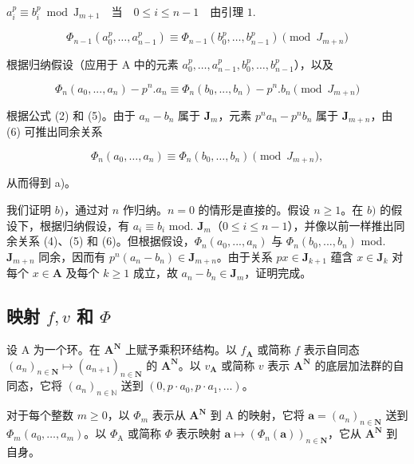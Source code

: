 \(a_{i}^{p}\equiv b_{i}^{p}\bmod \mathrm{J}_{m + 1}\quad \text{当}\quad 0\leqslant i\leqslant n - 1\quad \text{由引理 } 1.\)

\[
\Phi_ {n - 1} (a _ {0} ^ {p}, \dots , a _ {n - 1} ^ {p}) \equiv \Phi_ {n - 1} (b _ {0} ^ {p}, \dots , b _ {n - 1} ^ {p}) \pmod{J _ {m + n}}\tag{5}
\]

根据归纳假设（应用于 A 中的元素 \(a_0^p, \ldots, a_{n-1}^p, b_0^p, \ldots, b_{n-1}^p\)），以及

\[
\Phi_ {n} (a _ {0},..., a _ {n}) - p ^ {n}. a _ {n} \equiv \Phi_ {n} (b _ {0},..., b _ {n}) - p ^ {n}. b _ {n} \pmod{J _ {m + n}}\tag{6}
\]

根据公式 (2) 和 (5)。由于 \(a_{n}-b_{n}\) 属于 \(\mathbf{J}_{m}\)，元素 \(p^{n}a_{n}-p^{n}b_{n}\) 属于 \(\mathbf{J}_{m+n}\)，由 (6) 可推出同余关系

\[
\Phi_ {n} (a _ {0}, \dots , a _ {n}) \equiv \Phi_ {n} (b _ {0}, \dots , b _ {n}) \pmod{J _ {m + n}},
\]

从而得到 a)。

  我们证明 \(b)\)，通过对 \(n\) 作归纳。\(n=0\) 的情形是直接的。假设 \(n\geqslant1\)。在 \(b)\) 的假设下，根据归纳假设，有 \(a_{i}\equiv b_{i}\) mod. \(\mathbf{J}_{m}\)（\(0\leqslant i\leqslant n-1\)），并像以前一样推出同余关系 (4)、(5) 和 (6)。但根据假设，\(\Phi_{n}(a_{0},...,a_{n})\) 与 \(\Phi_{n}(b_{0},...,b_{n})\) mod. \(\mathbf{J}_{m+n}\) 同余，因而有 \(p^{n}(a_{n}-b_{n})\in\mathbf{J}_{m+n}\)。由于关系 \(p x\in\mathbf{J}_{k+1}\) 蕴含 \(x\in\mathbf{J}_{k}\) 对每个 \(x\in\mathbf{A}\) 及每个 \(k\geqslant1\) 成立，故 \(a_{n}-b_{n}\in\mathbf{J}_{m}\)，证明完成。

\subsection{\texorpdfstring{映射 \(f, v\) 和 \(\Phi\)}{映射 f、v 和 Φ}}

  设 A 为一个环。在 \(\mathbf{A}^{\mathbf{N}}\) 上赋予乘积环结构。以 \(f_{\mathbf{A}}\) 或简称 \(f\) 表示自同态 \((a_{n})_{n\in\mathbf{N}}\mapsto(a_{n+1})_{n\in\mathbf{N}}\) 的 \(\mathbf{A}^{\mathbf{N}}\)。以 \(v_{\mathbf{A}}\) 或简称 \(v\) 表示 \(\mathbf{A}^{\mathbf{N}}\) 的底层加法群的自同态，它将 \((a_{n})_{n\in\mathbb{N}}\) 送到 \((0,p\cdot a_{0},p\cdot a_{1},...)\)。

  对于每个整数 \(m \geqslant 0\)，以 \(\Phi_{m}\) 表示从 \(\mathbf{A}^{\mathbf{N}}\) 到 A 的映射，它将 \(\boldsymbol{a} = (a_{n})_{n \in \mathbf{N}}\) 送到 \(\Phi_{m}(a_{0}, \ldots, a_{m})\)。以 \(\Phi_{\mathrm{A}}\) 或简称 \(\Phi\) 表示映射 \(\boldsymbol{a} \mapsto (\Phi_{n}(\boldsymbol{a}))_{n \in \mathbf{N}}\)，它从 \(\mathbf{A}^{\mathbf{N}}\) 到自身。


